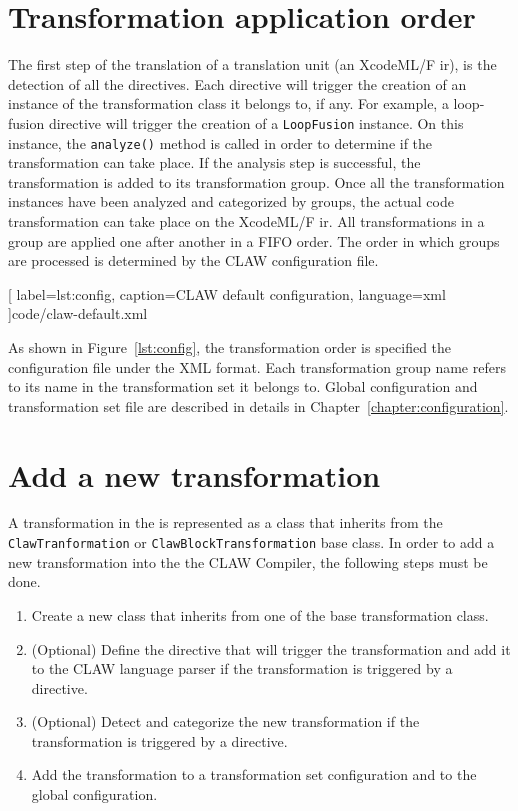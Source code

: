\section{Transformation application order}
The first step of the translation of a translation unit (an XcodeML/F \gls{ir}),
is the detection of all the directives. Each directive will trigger the
creation of an instance of the transformation class it belongs to, if any. 
For example, a loop-fusion directive will trigger the creation of a 
\lstinline|LoopFusion| instance. On this instance, the \lstinline|analyze()| 
method is called in order to determine if the transformation can take place.
If the analysis step is successful, the transformation is added to its 
transformation group. Once all the transformation instances have been analyzed
and categorized by groups, the actual code transformation can take place on 
the XcodeML/F \gls{ir}. All transformations in a group are applied one after 
another in a FIFO order. The order in which groups are processed is determined 
by the CLAW configuration file.


  [
    label=lst:config,
    caption=CLAW default configuration,
    language=xml
  ]{code/claw-default.xml}

As shown in Figure~\ref{lst:config}, the transformation order is specified the
configuration file under the XML format.
Each transformation group name refers to its name in the transformation set it
belongs to. Global configuration and transformation set file are described in
details in Chapter~\ref{chapter:configuration}.

\section{Add a new transformation}
\label{section:new_trans}
A transformation in the \clawfc is represented as a class that inherits from
the \lstinline|ClawTranformation| or \lstinline|ClawBlockTransformation|
base class. In order to add a new transformation into the the CLAW Compiler,
the following steps must be done.

\begin{enumerate}
\item Create a new class that inherits from one of the base transformation
      class.
\item (Optional) Define the directive that will trigger the transformation 
      and add it to the CLAW language parser if the transformation is 
      triggered by a directive.
\item (Optional) Detect and categorize the new transformation if the 
      transformation is triggered by a directive.
\item Add the transformation to a transformation set configuration and to
      the global configuration.
\end{enumerate}

